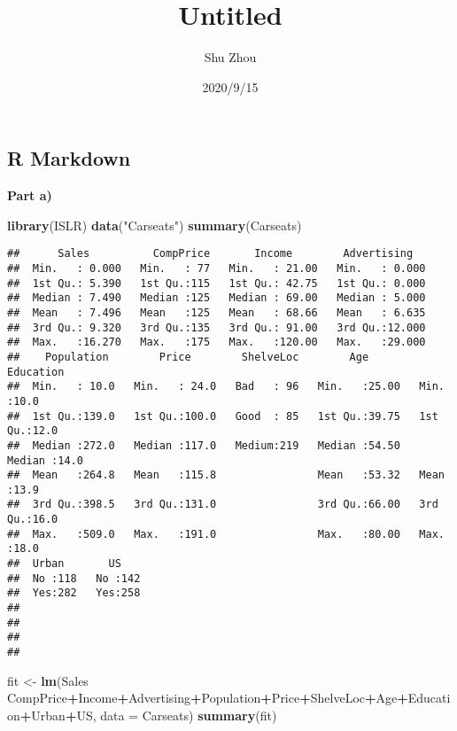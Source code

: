 \documentclass[
]{article}
\title{Untitled}
\author{Shu Zhou}
\date{2020/9/15}
\newenvironment{Shaded}{\begin{snugshade}}{\end{snugshade}}
\newcommand{\DataTypeTok}[1]{\textcolor[rgb]{0.13,0.29,0.53}{#1}}
\newcommand{\KeywordTok}[1]{\textcolor[rgb]{0.13,0.29,0.53}{\textbf{#1}}}
\newcommand{\NormalTok}[1]{#1}
\newcommand{\OperatorTok}[1]{\textcolor[rgb]{0.81,0.36,0.00}{\textbf{#1}}}
\newcommand{\StringTok}[1]{\textcolor[rgb]{0.31,0.60,0.02}{#1}}
\begin{document}
\maketitle

\hypertarget{r-markdown}{%
\subsection{R Markdown}\label{r-markdown}}

\textbf{Part a)}

\begin{Shaded}
\begin{Highlighting}[]
\KeywordTok{library}\NormalTok{(ISLR)}
\KeywordTok{data}\NormalTok{(}\StringTok{"Carseats"}\NormalTok{)}
\KeywordTok{summary}\NormalTok{(Carseats)}
\end{Highlighting}
\end{Shaded}

\begin{verbatim}
##      Sales          CompPrice       Income        Advertising    
##  Min.   : 0.000   Min.   : 77   Min.   : 21.00   Min.   : 0.000  
##  1st Qu.: 5.390   1st Qu.:115   1st Qu.: 42.75   1st Qu.: 0.000  
##  Median : 7.490   Median :125   Median : 69.00   Median : 5.000  
##  Mean   : 7.496   Mean   :125   Mean   : 68.66   Mean   : 6.635  
##  3rd Qu.: 9.320   3rd Qu.:135   3rd Qu.: 91.00   3rd Qu.:12.000  
##  Max.   :16.270   Max.   :175   Max.   :120.00   Max.   :29.000  
##    Population        Price        ShelveLoc        Age          Education   
##  Min.   : 10.0   Min.   : 24.0   Bad   : 96   Min.   :25.00   Min.   :10.0  
##  1st Qu.:139.0   1st Qu.:100.0   Good  : 85   1st Qu.:39.75   1st Qu.:12.0  
##  Median :272.0   Median :117.0   Medium:219   Median :54.50   Median :14.0  
##  Mean   :264.8   Mean   :115.8                Mean   :53.32   Mean   :13.9  
##  3rd Qu.:398.5   3rd Qu.:131.0                3rd Qu.:66.00   3rd Qu.:16.0  
##  Max.   :509.0   Max.   :191.0                Max.   :80.00   Max.   :18.0  
##  Urban       US     
##  No :118   No :142  
##  Yes:282   Yes:258  
##                     
##                     
##                     
## 
\end{verbatim}

\begin{Shaded}
\begin{Highlighting}[]
\NormalTok{fit <-}\StringTok{ }\KeywordTok{lm}\NormalTok{(Sales }\OperatorTok{~}\StringTok{ }\NormalTok{CompPrice}\OperatorTok{+}\NormalTok{Income}\OperatorTok{+}\NormalTok{Advertising}\OperatorTok{+}\NormalTok{Population}\OperatorTok{+}\NormalTok{Price}\OperatorTok{+}\NormalTok{ShelveLoc}\OperatorTok{+}\NormalTok{Age}\OperatorTok{+}\NormalTok{Education}\OperatorTok{+}\NormalTok{Urban}\OperatorTok{+}\NormalTok{US, }\DataTypeTok{data =}\NormalTok{ Carseats)}
\KeywordTok{summary}\NormalTok{(fit)}
\end{Highlighting}
\end{Shaded}
\end{document}
